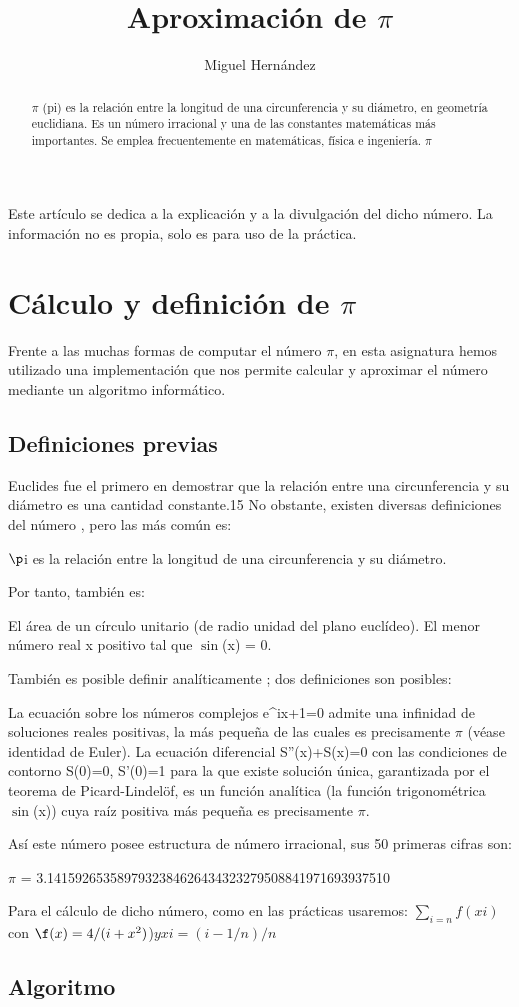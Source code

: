 \documentclass[12pt,a4paper]{article}
\author{Miguel Hernández}
\title{Aproximación de $\pi$}
\begin{document}
\maketitle
\talbeofcontents

\begin{abstract}
$\pi$ (pi) es la relación entre la longitud de una circunferencia y su diámetro, en geometría euclidiana. Es un número irracional y una de las constantes matemáticas más importantes. Se emplea frecuentemente en matemáticas, física e ingeniería.
$\pi$
\end{abstract}
Este artículo se dedica a la explicación y a la divulgación del dicho número. La información no es propia, solo es para uso de la práctica.
\section{Cálculo y definición de $\pi$}
Frente a las muchas formas de computar el número $\pi$, en esta asignatura hemos utilizado una implementación que nos permite calcular y aproximar el número mediante un algoritmo informático.
\begin{sangria}
\subsection{Definiciones previas}

Euclides fue el primero en demostrar que la relación entre una circunferencia y su diámetro es una cantidad constante.15 No obstante, existen diversas definiciones del número \pi, pero las más común es:

    $\p$i es la relación entre la longitud de una circunferencia y su diámetro.

Por tanto, también \pi es:

    El área de un círculo unitario (de radio unidad del plano euclídeo).
    El menor número real x positivo tal que $\sin$(x) = 0.

También es posible definir analíticamente \pi; dos definiciones son posibles:

    La ecuación sobre los números complejos e^{ix}+1=0 admite una infinidad de soluciones reales positivas, la más pequeña de las cuales es precisamente $\pi$ (véase identidad de Euler).
    La ecuación diferencial S''(x)+S(x)=0 con las condiciones de contorno S(0)=0, S'(0)=1 para la que existe solución única, garantizada por el teorema de Picard-Lindelöf, es un función analítica (la función trigonométrica $\sin$(x)) cuya raíz positiva más pequeña es precisamente $\pi$.

Así este número posee estructura de número irracional, sus 50 primeras cifras son:

    $\pi$ = 3.1415926535897932384626434323279508841971693937510
    
Para el cálculo de dicho número, como en las prácticas usaremos:
   $\sum_{i=n} f(xi)$ con $\f(x)=4/(i+x^2)$)$ y xi=(i-1/n)/n$

\subsection{Algoritmo}
\end{sangria}
\end{document}
